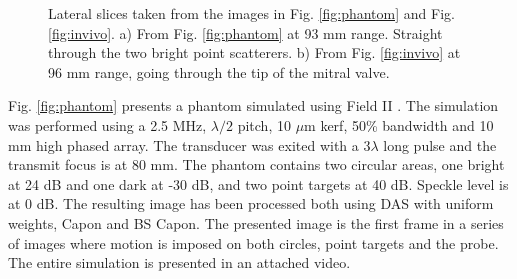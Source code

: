 \documentclass[12pt,journal,onecolumn]{IEEEtran}
\begin{document}
\begin{figure}[!t]
\centerline{
\hfil
{}
}
\caption{Lateral slices taken from the images in Fig. \ref{fig:phantom} and Fig. \ref{fig:invivo}. a) From Fig. \ref{fig:phantom} at 93 mm range. Straight through the two bright point scatterers. b) From Fig. \ref{fig:invivo} at 96 mm range, going through the tip of the mitral valve.}
\label{fig:slices}
\end{figure}

Fig. \ref{fig:phantom} presents a phantom simulated using Field II \cite{Jensen1992}. The simulation was performed using a 2.5 MHz, $\lambda/2$ pitch, 10 $\mu$m kerf, 50\% bandwidth and 10 mm high phased array. The transducer was exited with a $3\lambda$ long pulse and the transmit focus is at 80 mm. The phantom contains two circular areas, one bright at 24 dB and one dark at -30 dB, and two point targets at 40 dB. Speckle level is at 0 dB. The resulting image has been processed both using DAS with uniform weights, Capon and BS Capon. The presented image is the first frame in a series of images where motion is imposed on both circles, point targets and the probe. The entire simulation is presented in an attached video.
\end{document}
